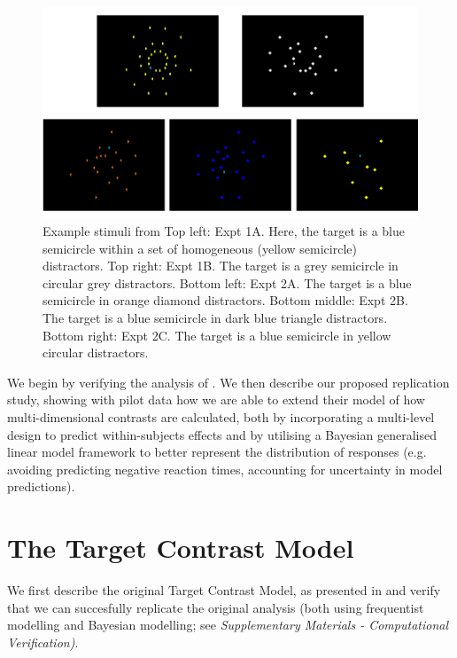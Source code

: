 \documentclass[preprint,12pt,authoryear]{elsarticle}
\begin{document}
\begin{figure}[ht]
\centering
\includegraphics[width=\textwidth]{../plots/example_stimuli_figure.pdf}
\caption{Example stimuli from \cite{buetti2019predicting} Top left: Expt 1A. Here, the target is a blue semicircle within a set of homogeneous (yellow semicircle) distractors. Top right: Expt 1B. The target is a grey semicircle in circular grey distractors. Bottom left: Expt 2A. The target is a blue semicircle in orange diamond distractors. Bottom middle: Expt 2B. The target is a blue semicircle in dark blue triangle distractors. Bottom right: Expt 2C. The target is a blue semicircle in yellow circular distractors.}
\label{fig:buetti2019_stimulus}
\end{figure}

We begin by verifying the analysis of \cite{buetti2019predicting}. We then describe our proposed replication study, showing with pilot data how we are able to extend their model of how multi-dimensional contrasts are calculated, both by incorporating a multi-level design to predict within-subjects effects and by utilising a Bayesian generalised linear model framework to better represent the distribution of responses (e.g. avoiding predicting negative reaction times, accounting for uncertainty in model predictions). 

\section{The Target Contrast Model}
\label{sec:reansalysis}

We first describe the original Target Contrast Model, as presented in \cite{buetti2019predicting} and verify that we can succesfully replicate the original analysis (both using frequentist modelling and Bayesian modelling; see \textit{Supplementary Materials - Computational Verification)}.
\end{document}
